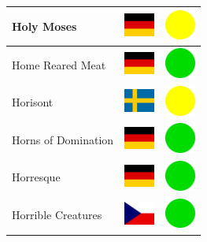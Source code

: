 \documentclass[12pt, a4paper, twoside]{report}
\begin{document}
\begin{center}
\begin{longtable}{|p{5cm}|p{2cm}|p{2cm}|}
 Holy Moses                                                 & \includegraphics[width=1cm]{../4x3/de} &   \includegraphics[width=1cm]{../likes/m} \\ \hline
 Home Reared Meat                                           & \includegraphics[width=1cm]{../4x3/de} &   \includegraphics[width=1cm]{../likes/y} \\ \hline
 Horisont                                                   & \includegraphics[width=1cm]{../4x3/se} &   \includegraphics[width=1cm]{../likes/m} \\ \hline
 Horns of Domination                                        & \includegraphics[width=1cm]{../4x3/de} &   \includegraphics[width=1cm]{../likes/y} \\ \hline
 Horresque                                                  & \includegraphics[width=1cm]{../4x3/de} &   \includegraphics[width=1cm]{../likes/y} \\ \hline
 Horrible Creatures                                         & \includegraphics[width=1cm]{../4x3/cz} &   \includegraphics[width=1cm]{../likes/y} \\ \hline

\end{longtable}
\end{center}
\end{document}
